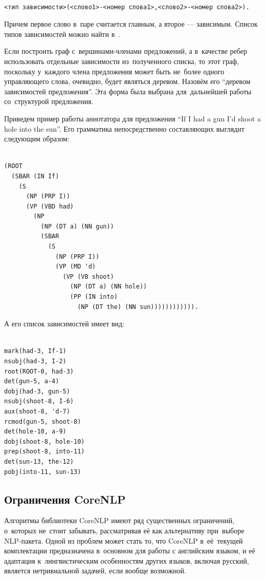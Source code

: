 \begin{verbatim}

<тип зависимости>(<слово1>-<номер слова1>,<слово2>-<номер слова2>).

\end{verbatim}

Причем первое слово в~паре считается главным, а второе --- зависимым.
Список типов зависимостей можно найти в~\cite{dependencies}.

Если построить граф с~вершинами-членами предложений, а в~качестве ребер использовать отдельные зависимости из~полученного списка, 
то этот граф, поскольку у~каждого члена предложения может быть не~более одного управляющего слова, 
очевидно, будет являться деревом. 
Назовём его ``деревом зависимостей предложения''.
Эта форма была выбрана для~дальнейшей работы со~структурой предложения.

Приведем пример работы аннотатора для предложения ``If I had a gun I'd shoot a hole into the sun''.
Его грамматика непосредственно составляющих выглядит следующим образом:

\begin{verbatim}

(ROOT
  (SBAR (IN If)
    (S
      (NP (PRP I))
      (VP (VBD had)
        (NP
          (NP (DT a) (NN gun))
          (SBAR
            (S
              (NP (PRP I))
              (VP (MD 'd)
                (VP (VB shoot)
                  (NP (DT a) (NN hole))
                  (PP (IN into)
                    (NP (DT the) (NN sun)))))))))))).

\end{verbatim}

А его список зависимостей имеет вид:

\begin{verbatim}

mark(had-3, If-1)
nsubj(had-3, I-2)
root(ROOT-0, had-3)
det(gun-5, a-4)
dobj(had-3, gun-5)
nsubj(shoot-8, I-6)
aux(shoot-8, 'd-7)
rcmod(gun-5, shoot-8)
det(hole-10, a-9)
dobj(shoot-8, hole-10)
prep(shoot-8, into-11)
det(sun-13, the-12)
pobj(into-11, sun-13)

\end{verbatim}

\subsection{Ограничения CoreNLP}

Алгоритмы библиотеки CoreNLP имеют ряд существенных ограничений, о~которых не~стоит забывать, 
рассматривая её как альтернативу при~выборе NLP-пакета.
Одной из проблем может стать то, что CoreNLP в~её~текущей комплектации
предназначена в~основном для работы с английским языком, 
и её адаптация к~лингвистическим особенностям других языков, включая русский,
является нетривиальной задачей, если вообще возможной.

